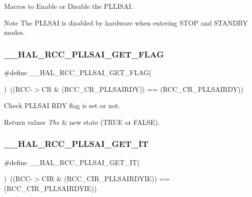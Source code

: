 Macros to Enable or Disable the P\+L\+L\+I\+S\+AI. 

\begin{DoxyNote}{Note}
The P\+L\+L\+S\+AI is disabled by hardware when entering S\+T\+OP and S\+T\+A\+N\+D\+BY modes. 
\end{DoxyNote}
\mbox{\label{group___r_c_c_ex___exported___macros_ga573e020db1ec841ff9c9d36da2b82a6b}} 
\subsubsection{\texorpdfstring{\_\_HAL\_RCC\_PLLSAI\_GET\_FLAG}{\_\_HAL\_RCC\_PLLSAI\_GET\_FLAG}}
{\footnotesize\ttfamily \#define \+\_\+\+\_\+\+H\+A\+L\+\_\+\+R\+C\+C\+\_\+\+P\+L\+L\+S\+A\+I\+\_\+\+G\+E\+T\+\_\+\+F\+L\+AG(\begin{DoxyParamCaption}{ }\end{DoxyParamCaption})~((R\+CC-\/$>$CR \& (R\+C\+C\+\_\+\+C\+R\+\_\+\+P\+L\+L\+S\+A\+I\+R\+DY)) == (R\+C\+C\+\_\+\+C\+R\+\_\+\+P\+L\+L\+S\+A\+I\+R\+DY))}



Check P\+L\+L\+S\+AI R\+DY flag is set or not. 


\begin{DoxyRetVals}{Return values}
{\em The} & new state (T\+R\+UE or F\+A\+L\+SE). \\
\hline
\end{DoxyRetVals}
\mbox{\label{group___r_c_c_ex___exported___macros_ga478a4064faa2f2f1fa7320fe6b60b5ba}} 
\subsubsection{\texorpdfstring{\_\_HAL\_RCC\_PLLSAI\_GET\_IT}{\_\_HAL\_RCC\_PLLSAI\_GET\_IT}}
{\footnotesize\ttfamily \#define \+\_\+\+\_\+\+H\+A\+L\+\_\+\+R\+C\+C\+\_\+\+P\+L\+L\+S\+A\+I\+\_\+\+G\+E\+T\+\_\+\+IT(\begin{DoxyParamCaption}{ }\end{DoxyParamCaption})~((R\+CC-\/$>$C\+IR \& (R\+C\+C\+\_\+\+C\+I\+R\+\_\+\+P\+L\+L\+S\+A\+I\+R\+D\+Y\+IE)) == (R\+C\+C\+\_\+\+C\+I\+R\+\_\+\+P\+L\+L\+S\+A\+I\+R\+D\+Y\+IE))}



